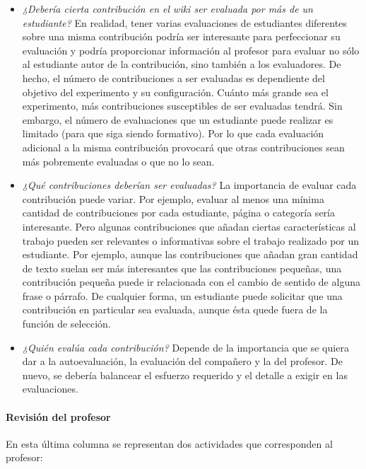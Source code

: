 \begin{itemize}
\item \emph{¿Debería cierta contribución en el wiki ser evaluada por más de un estudiante?} En realidad, tener varias evaluaciones de estudiantes diferentes sobre una misma contribución podría ser interesante para perfeccionar su evaluación y podría proporcionar información al profesor para evaluar no sólo al estudiante autor de la contribución, sino también a los evaluadores. De hecho, el número de contribuciones a ser evaluadas es dependiente del objetivo del experimento y su configuración. Cuánto más grande sea el experimento, más contribuciones susceptibles de ser evaluadas tendrá. Sin embargo, el número de evaluaciones que un estudiante puede realizar es limitado (para que siga siendo formativo). Por lo que cada evaluación adicional a la misma contribución provocará que otras contribuciones sean más pobremente evaluadas o que no lo sean.
\item \emph{¿Qué contribuciones deberían ser evaluadas?} La importancia de evaluar cada contribución puede variar. Por ejemplo, evaluar al menos una mínima cantidad de contribuciones por cada estudiante, página o categoría sería interesante. Pero algunas contribuciones que añadan ciertas características al trabajo pueden ser relevantes o informativas sobre el trabajo realizado por un estudiante. Por ejemplo, aunque las contribuciones que añadan gran cantidad de texto suelan ser más interesantes que las contribuciones pequeñas, una contribución pequeña puede ir relacionada con el cambio de sentido de alguna frase o párrafo. De cualquier forma, un estudiante puede solicitar que una contribución en particular sea evaluada, aunque ésta quede fuera de la función de selección.
\item \emph{¿Quién evalúa cada contribución?} Depende de la importancia que se quiera dar a la autoevaluación, la evaluación del compañero y la del profesor. De nuevo, se debería balancear el esfuerzo requerido y el detalle a exigir en las evaluaciones.
\end{itemize}


\paragraph*{Revisión del profesor}

En esta última columna se representan dos actividades que corresponden al profesor:

